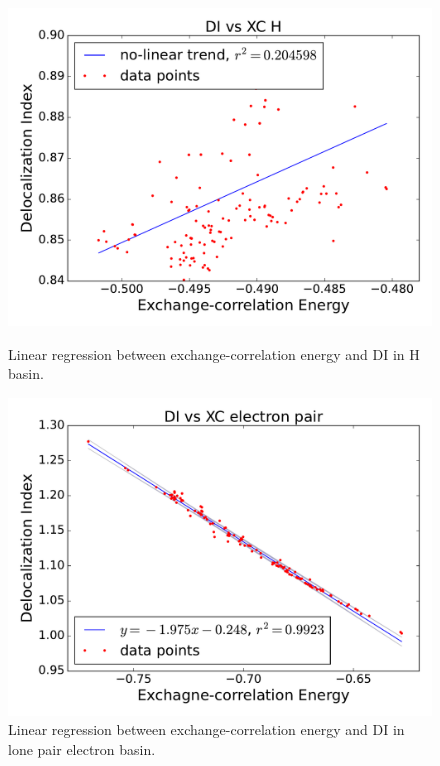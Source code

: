 \begin{figure}[th]
    \begin{minipage}[t]{0.47\textwidth}
      \centering
      \includegraphics[width=\textwidth]{4/plots/promelf/xc_di_h.pdf}
      \caption{Linear regression between exchange-correlation energy
      and DI in H basin.}
      \label{di_xc_h}
    \end{minipage}%
    \hfill
    \begin{minipage}[t]{0.47\textwidth}
      \centering
      \includegraphics[width=\textwidth]{4/plots/promelf/xc_di_e.pdf}
      \caption{Linear regression between exchange-correlation energy
      and DI in lone pair electron basin.}
      \label{di_xc_e}
    \end{minipage}%
\end{figure}

